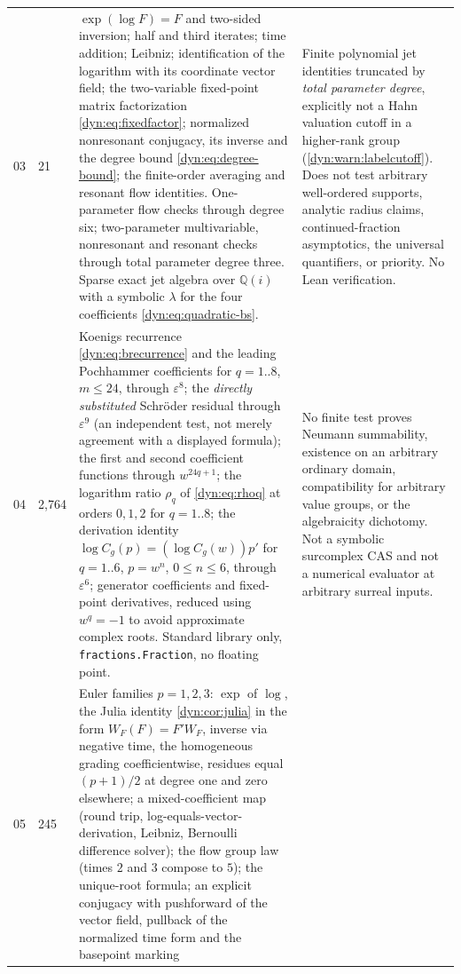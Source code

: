 \documentclass[11pt,letterpaper]{article}
\theoremstyle{definition}
\theoremstyle{remark}
\newcommand{\Q}{\mathbb Q}
\newcommand{\eps}{\varepsilon}
\numberwithin{equation}{section}
\begin{document}
\begin{longtable}{@{}P{0.12\textwidth}P{0.10\textwidth}P{0.42\textwidth}P{0.29\textwidth}@{}}
03 & 21 &
$\exp(\log F)=F$ and two-sided inversion; half and third iterates; time
addition; Leibniz; identification of the logarithm with its coordinate
vector field; the two-variable fixed-point matrix factorization
\eqref{dyn:eq:fixedfactor}; normalized nonresonant conjugacy, its inverse
and the degree bound \eqref{dyn:eq:degree-bound}; the finite-order
averaging and resonant flow identities. One-parameter flow checks through
degree six; two-parameter multivariable, nonresonant and resonant checks
through total parameter degree three. Sparse exact jet algebra over
$\Q(i)$ with a symbolic $\lambda$ for the four coefficients
\eqref{dyn:eq:quadratic-bs}.
& Finite polynomial jet identities truncated by \emph{total parameter
degree}, explicitly not a Hahn valuation cutoff in a higher-rank group
(\cref{dyn:warn:labelcutoff}). Does not test arbitrary well-ordered
supports, analytic radius claims, continued-fraction asymptotics, the
universal quantifiers, or priority. No Lean verification.\\[4pt]
04 & 2{,}764 &
Koenigs recurrence \eqref{dyn:eq:brecurrence} and the leading Pochhammer
coefficients for $q=1..8$, $m\le24$, through $\eps^{8}$; the \emph{directly
substituted} Schr\"oder residual through $\eps^{9}$ (an independent test,
not merely agreement with a displayed formula); the first and second
coefficient functions through $w^{24q+1}$; the logarithm ratio $\rho_q$ of
\eqref{dyn:eq:rhoq} at orders $0,1,2$ for $q=1..8$; the derivation identity
$\log C_g(p)=(\log C_g(w))p'$ for $q=1..6$, $p=w^{n}$, $0\le n\le6$,
through $\eps^{6}$; generator coefficients and fixed-point derivatives,
reduced using $w^{q}=-1$ to avoid approximate complex roots. Standard
library only, \texttt{fractions.Fraction}, no floating point.
& No finite test proves Neumann summability, existence on an arbitrary
ordinary domain, compatibility for arbitrary value groups, or the
algebraicity dichotomy. Not a symbolic surcomplex CAS and not a numerical
evaluator at arbitrary surreal inputs.\\[4pt]
05 & 245 &
Euler families $p=1,2,3$: $\exp$ of $\log$, the Julia identity
\cref{dyn:cor:julia} in the form $W_F(F)=F'W_F$, inverse via negative
time, the homogeneous grading coefficientwise, residues equal $(p+1)/2$ at
degree one and zero elsewhere; a mixed-coefficient map (round trip,
log-equals-vector-derivation, Leibniz, Bernoulli difference solver); the
flow group law (times $2$ and $3$ compose to $5$); the unique-root
formula; an explicit conjugacy with pushforward of the vector field,
pullback of the normalized time form and the basepoint marking

\end{longtable}
\end{document}
